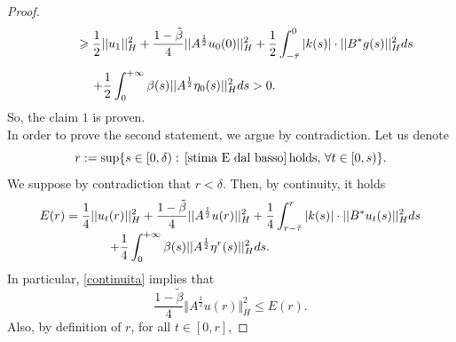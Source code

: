 \documentclass[11pt]{article}
\renewcommand{\ge}{\geqslant}
\renewcommand{\leq}{\leqslant}
\begin{document}
\begin{proof}
$$\begin{array}{l}
		\hspace{0,9 cm}
		\vspace{0.3cm}\displaystyle{ \ge\frac{1}{2}||u_1||^2_H+\frac{1-\tilde{\beta}}{4}||A^\frac{1}{2}u_0(0)||^2_H +\frac{1}{2}\int_{-\bar\tau}^0 |k(s)| \cdot ||B^*g(s)||^2_H ds }\\
		\hspace{1.3 cm}
		\displaystyle{+\frac{1}{2}\int_0^{+\infty} \beta(s) ||A^\frac{1}{2} \eta_0(s)||^2_H ds>0.}
	\end{array}
	$$
	So, the claim $1$ is proven.
	\\In order to prove the second statement, we argue by contradiction. Let us denote
	$$
	r:=\sup \{ s\in [0,\delta) : \,\eqref{stima E dal basso}\, \text{holds},\, \forall t\in [0,s)\}.
	$$
	We suppose by contradiction that $r<\delta$. Then, by continuity, it holds
	\begin{equation}
		\label{continuita}
		\begin{array}{l}
			\displaystyle{E(r)=\frac{1}{4}||u_t(r)||^2_H+\frac{1-\tilde{\beta}}{4}||A^\frac{1}{2}u(r)||_H^2+\frac{1}{4}\int_{r-\bar\tau}^r |k(s)| \cdot ||B^*u_t(s)||_H^2 ds}\\
			\hspace{2 cm}
			\displaystyle{ +\frac{1}{4} \int_0^{+\infty} \beta(s)||A^\frac{1}{2}\eta^r(s)||_H^2 ds.}
		\end{array}
	\end{equation}
	In particular, \eqref{continuita} implies that
	$$
	\frac{1-\tilde{\beta}}{4} \Vert A^{\frac 1 2} u(r)\Vert^2_H\leq E(r).
	$$
	Also, by definition of $r$, for all $t\in [0,r]$, 


\end{proof}
\end{document}
